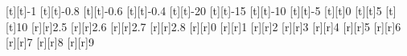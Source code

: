 \selectfont%
%
[t][t]{-1}%
[t][t]{-0.8}%
[t][t]{-0.6}%
[t][t]{-0.4}%
[t][t]{-20}%
[t][t]{-15}%
[t][t]{-10}%
[t][t]{-5}%
[t][t]{0}%
[t][t]{5}%
[t][t]{10}%
%
[r][r]{2.5}%
[r][r]{2.6}%
[r][r]{2.7}%
[r][r]{2.8}%
[r][r]{0}%
[r][r]{1}%
[r][r]{2}%
[r][r]{3}%
[r][r]{4}%
[r][r]{5}%
[r][r]{6}%
[r][r]{7}%
[r][r]{8}%
[r][r]{9}%
%
%
